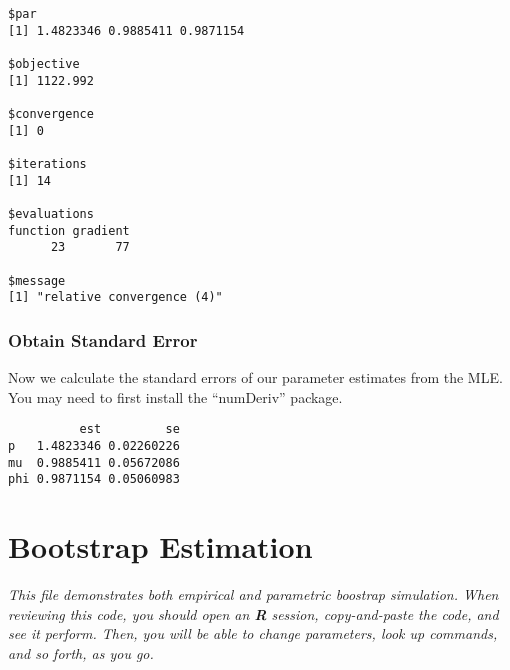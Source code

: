 \documentclass[]{book}
\newenvironment{Shaded}{\begin{snugshade}}{\end{snugshade}}
\newcommand{\KeywordTok}[1]{\textcolor[rgb]{0.13,0.29,0.53}{\textbf{#1}}}
\newcommand{\StringTok}[1]{\textcolor[rgb]{0.31,0.60,0.02}{#1}}
\newcommand{\OperatorTok}[1]{\textcolor[rgb]{0.81,0.36,0.00}{\textbf{#1}}}
\newcommand{\NormalTok}[1]{#1}
\theoremstyle{definition}
\theoremstyle{definition}
\theoremstyle{definition}
\theoremstyle{remark}
\begin{document}
\begin{verbatim}
$par
[1] 1.4823346 0.9885411 0.9871154

$objective
[1] 1122.992

$convergence
[1] 0

$iterations
[1] 14

$evaluations
function gradient 
      23       77 

$message
[1] "relative convergence (4)"
\end{verbatim}

\subsection{Obtain Standard Error}\label{obtain-standard-error-4}

Now we calculate the standard errors of our parameter estimates from the
MLE. You may need to first install the ``numDeriv'' package.

\begin{Shaded}
\end{Shaded}

\begin{verbatim}
          est         se
p   1.4823346 0.02260226
mu  0.9885411 0.05672086
phi 0.9871154 0.05060983
\end{verbatim}

\chapter{Bootstrap Estimation}\label{bootstrap-estimation}

\emph{This file demonstrates both empirical and parametric boostrap
simulation. When reviewing this code, you should open an \textbf{R}
session, copy-and-paste the code, and see it perform. Then, you will be
able to change parameters, look up commands, and so forth, as you go.}
\end{document}
